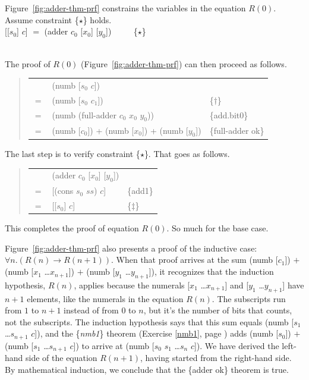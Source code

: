 Figure~\ref{fig:adder-thm-prf} constrains
the variables in the equation $R(0)$.
Assume constraint \{$\star$\} holds.
\vspace{1mm}\\
\hspace*{1.5cm}[[$s_0$] $c$] $=$ (adder $c_0$ [$x_0$] [$y_0$]) ~~~~ \{$\star$\}

~~\\
The proof of $R(0)$ (Figure~\ref{fig:adder-thm-prf}) can then proceed as follows.
\begin{quote}
\begin{tabular}{rll}
    & (numb [$s_0$ $c$])                               &                   \\
$=$ & (numb [$s_0$ $c_1$])                             & \{$\dagger$\}    \\
$=$ & (numb (full-adder $c_0$ $x_0$ $y_0$))            & \{add.bit0\}      \\
$=$ & (numb [$c_0$]) + (numb [$x_0$]) + (numb [$y_0$]) & \{full-adder ok\} \\
\end{tabular}
\end{quote}

The last step is to verify constraint \{$\star$\}.
That goes as follows.
\begin{quote}
\begin{tabular}{rll}
    & (adder $c_0$ [$x_0$] [$y_0$]) &               \\
$=$ & [(cons $s_0$ $ss$) $c$]       & \{add1\}      \\
$=$ & [[$s_0$] $c$]                 & \{$\ddagger$\}\\
\end{tabular}
\end{quote}

This completes the proof of equation $R(0)$.
So much for the base case.

Figure~\ref{fig:adder-thm-prf} also presents
a proof of the inductive case: $\forall n.(R(n) \rightarrow R(n+1))$.
When that proof arrives at the sum
(numb [$c_1$]) $+$ (numb [$x_1$ \dots $x_{n+1}$]) $+$ (numb [$y_1$ \dots $y_{n+1}$]),
it recognizes that the induction hypothesis, $R(n)$, applies because
the numerals [$x_1$ \dots $x_{n+1}$] and [$y_1$ \dots $y_{n+1}$] have $n+1$
elements, like the numerals in the equation $R(n)$.
The subscripts run from $1$ to $n+1$ instead of from $0$ to $n$,
but it's the number of bits that counts, not the subscripts.
The induction hypothesis says that this sum equals
(numb [$s_1$ \dots $s_{n+1}$ $c$]), and
the \{\emph{nmb1}\} theorem (Exercise \ref{nmb1}, page \pageref{nmb1})
adds (numb [$s_0$]) $+$ (numb [$s_1$ \dots $s_{n+1}$ $c$]) 
to arrive at (numb [$s_0$ $s_1$ \dots $s_{n}$ $c$]).
We have derived the left-hand side
of the equation $R(n+1)$, having started from the right-hand side.
By mathematical induction, we conclude that
the \{adder ok\} theorem is true.

